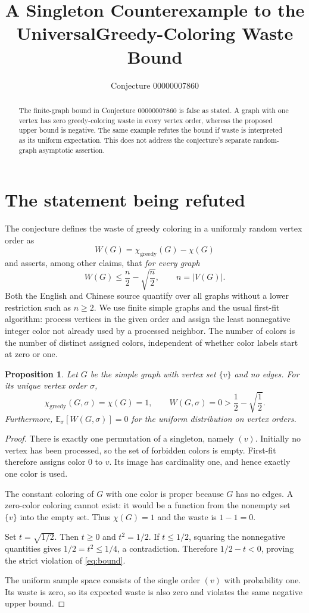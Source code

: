 \documentclass[11pt]{article}
\title{A Singleton Counterexample to the Universal\newline Greedy-Coloring Waste Bound}
\author{Conjecture 00000007860}
\date{}
\newtheorem{proposition}{Proposition}
\begin{document}
\maketitle
\begin{abstract}
The finite-graph bound in Conjecture 00000007860 is false as stated. A graph with one vertex has zero greedy-coloring waste in every vertex order, whereas the proposed upper bound is negative. The same example refutes the bound if waste is interpreted as its uniform expectation. This does not address the conjecture's separate random-graph asymptotic assertion.
\end{abstract}

\section*{The statement being refuted}
The conjecture defines the waste of greedy coloring in a uniformly random vertex order as
\[
 W(G)=\chi_{\mathrm{greedy}}(G)-\chi(G)
\]
and asserts, among other claims, that \emph{for every graph}
\begin{equation}\label{eq:bound}
 W(G)\leq \frac n2-\sqrt{\frac n2},\qquad n=|V(G)|.
\end{equation}
Both the English and Chinese source quantify over all graphs without a lower restriction such as $n\geq2$. We use finite simple graphs and the usual first-fit algorithm: process vertices in the given order and assign the least nonnegative integer color not already used by a processed neighbor. The number of colors is the number of distinct assigned colors, independent of whether color labels start at zero or one.

\begin{proposition}
Let $G$ be the simple graph with vertex set $\{v\}$ and no edges. For its unique vertex order $\sigma$,
\[
 \chi_{\mathrm{greedy}}(G,\sigma)=\chi(G)=1,
 \qquad W(G,\sigma)=0>\frac12-\sqrt{\frac12}.
\]
Furthermore, $\mathbb E_{\sigma}[W(G,\sigma)]=0$ for the uniform distribution on vertex orders.
\end{proposition}
\begin{proof}
There is exactly one permutation of a singleton, namely $(v)$. Initially no vertex has been processed, so the set of forbidden colors is empty. First-fit therefore assigns color $0$ to $v$. Its image has cardinality one, and hence exactly one color is used.

The constant coloring of $G$ with one color is proper because $G$ has no edges. A zero-color coloring cannot exist: it would be a function from the nonempty set $\{v\}$ into the empty set. Thus $\chi(G)=1$ and the waste is $1-1=0$.

Set $t=\sqrt{1/2}$. Then $t\geq0$ and $t^2=1/2$. If $t\leq1/2$, squaring the nonnegative quantities gives $1/2=t^2\leq1/4$, a contradiction. Therefore $1/2-t<0$, proving the strict violation of \eqref{eq:bound}.

The uniform sample space consists of the single order $(v)$ with probability one. Its waste is zero, so its expected waste is also zero and violates the same negative upper bound.
\end{proof}
\end{document}
